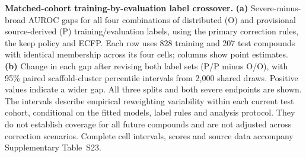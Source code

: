 \textbf{Matched-cohort training-by-evaluation label crossover.} \textbf{(a)} Severe-minus-broad AUROC gaps for all four combinations of distributed (O) and provisional source-derived (P) training/evaluation labels, using the primary correction rules, the keep policy and ECFP. Each row uses 828 training and 207 test compounds with identical membership across its four cells; columns show point estimates. \textbf{(b)} Change in each gap after revising both label sets (P/P minus O/O), with 95\% paired scaffold-cluster percentile intervals from 2,000 shared draws. Positive values indicate a wider gap. All three splits and both severe endpoints are shown. The intervals describe empirical reweighting variability within each current test cohort, conditional on the fitted models, label rules and analysis protocol. They do not establish coverage for all future compounds and are not adjusted across correction scenarios. Complete cell intervals, scores and source data accompany Supplementary Table~S23.
